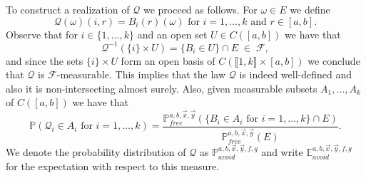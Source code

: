 \begin{definition}
To construct a realization of $\mathcal{Q}$ we proceed as follows. For $\omega \in E$ we define
$$\mathcal{Q}(\omega)(i,r) = B_i(r)(\omega) \mbox{ for $i = 1, \dots, k$ and $r \in [a,b]$}.$$
Observe that for $i \in \{1, \dots, k\}$ and an open set $U \in C([a,b])$ we have that 
$$\mathcal{Q}^{-1}(\{i\} \times U) = \{B_i \in U \} \cap E\; \in\; \mathcal{F},$$
and since the sets $\{i\} \times U$ form an open basis of $C(\llbracket 1, k \rrbracket \times [a,b])$ we conclude that $\mathcal{Q}$ is $\mathcal{F}$-measurable. This implies that the law $\mathcal{Q}$ is indeed well-defined and also it is non-intersecting almost surely.  Also, given measurable subsets $A_1, \dots, A_k$ of $C([a,b])$ we have that 
$$\mathbb{P}(\mathcal{Q}_i \in A_i \mbox{ for $i = 1, \dots, k$} ) = \frac{\mathbb{P}^{a,b, \vec{x},\vec{y}}_{free} \left( \{ B_i \in A_i \mbox{ for $i = 1, \dots, k$}\} \cap E \right) }{\mathbb{P}^{a,b, \vec{x},\vec{y}}_{free}(E)}.$$
We denote the probability distribution of $\mathcal{Q}$ as $\mathbb{P}_{avoid}^{a,b, \vec{x}, \vec{y}, f, g}$ and write $\mathbb{E}_{avoid}^{a,b, \vec{x}, \vec{y}, f, g}$ for the expectation with respect to this measure. 
\end{definition}


